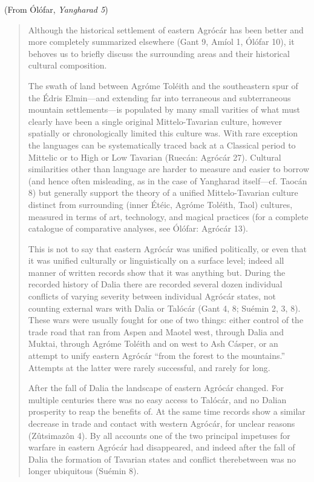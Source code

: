 \documentclass{article}
\begin{document}
(From Ólófar, \textit{Yangharad 5})

\color{black}
\begin{quotation}

Although the historical settlement of eastern Agrócár has been better and more completely summarized elsewhere (Gant 9, Amíol 1, Ólófar 10), it behoves us to briefly discuss the surrounding areas and their historical cultural composition.

The swath of land between Agróme Toléith and the southeastern spur of the Édris Elmin—and extending far into terraneous and subterraneous mountain settlements—is populated by many small varities of what must clearly have been a single original Mittelo-Tavarian culture, however spatially or chronologically limited this culture was. With rare exception the languages can be systematically traced back at a Classical period to Mittelic or to High or Low Tavarian (Ruecán: Agrócár 27). Cultural similarities other than language are harder to measure and easier to borrow (and hence often misleading, as in the case of Yangharad itself—cf. Taocán 8) but generally support the theory of a unified Mittelo-Tavarian culture distinct from surrounding (inner Étéic, Agróme Toléith, Taol) cultures, measured in terms of art, technology, and magical practices (for a complete catalogue of comparative analyses, see Ólófar: Agrócár 13).

This is not to say that eastern Agrócár was unified politically, or even that it was unified culturally or linguistically on a surface level; indeed all manner of written records show that it was anything but. During the recorded history of Dalia there are recorded several dozen individual conflicts of varying severity between individual Agrócár states, not counting external wars with Dalia or Talócár (Gant 4, 8; Suémin 2, 3, 8). These wars were usually fought for one of two things: either control of the trade road that ran from Aspen and Maotel west, through Dalia and Muktai, through Agróme Toléith and on west to Ash Cásper, or an attempt to unify eastern Agrócár ``from the forest to the mountains.'' Attempts at the latter were rarely successful, and rarely for long.

After the fall of Dalia the landscape of eastern Agrócár changed. For multiple centuries there was no easy access to Talócár, and no Dalian prosperity to reap the benefits of. At the same time records show a similar decrease in trade and contact with western Agrócár, for unclear reasons (Zûtsimazôn 4). By all accounts one of the two principal impetuses for warfare in eastern Agrócár had disappeared, and indeed after the fall of Dalia the formation of Tavarian states and conflict therebetween was no longer ubiquitous (Suémin 8).


\end{quotation}
\end{document}
